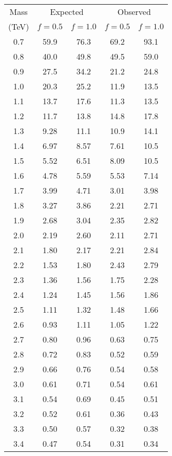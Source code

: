 \begin{table}[h!]
\begin{center}
\begin{tabular}{c||cc||cc}
\hline
Mass     & \multicolumn{2}{c}{Expected} & \multicolumn{2}{c}{Observed} \\
(\unit{TeV}) & $f=0.5$  & $f=1.0$ & $f=0.5$ & $f=1.0$  \\
\hline
\hline
0.7 & 59.9  &  76.3 & 69.2 &  93.1 \\
0.8 & 40.0  &  49.8 & 49.5 &  59.0 \\
0.9 & 27.5  &  34.2 & 21.2 &  24.8 \\
1.0 & 20.3  &  25.2 & 11.9 &  13.5\\
1.1 & 13.7  &  17.6 & 11.3 &  13.5 \\
1.2 & 11.7  &  13.8 & 14.8 &  17.8 \\
1.3 & 9.28  &  11.1 & 10.9 &  14.1 \\
1.4 & 6.97  &  8.57 & 7.61 &  10.5 \\
1.5 & 5.52  &  6.51 & 8.09 &  10.5 \\
1.6 & 4.78  &  5.59 & 5.53 &  7.14 \\
1.7 & 3.99  &  4.71 & 3.01 &  3.98 \\
1.8 & 3.27  &  3.86 & 2.21 &  2.71 \\
1.9 & 2.68  &  3.04 & 2.35 &  2.82 \\
2.0 & 2.19  &  2.60 & 2.11 &  2.71 \\
2.1 & 1.80  &  2.17 & 2.21 &  2.84 \\
2.2 & 1.53  &  1.80 & 2.43 &  2.79 \\
2.3 & 1.36  &  1.56 & 1.75 &  2.28 \\
2.4 & 1.24  &  1.45 & 1.56 &  1.86 \\
2.5 & 1.11  &  1.32 & 1.48 &  1.66 \\
2.6 & 0.93  &  1.11 & 1.05 &  1.22 \\
2.7 & 0.80  &  0.96 & 0.63 &  0.75 \\
2.8 & 0.72  &  0.83 & 0.52 &  0.59 \\
2.9 & 0.66  &  0.76 & 0.54 &  0.58 \\
3.0 & 0.61  &  0.71 & 0.54 &  0.61 \\
3.1 & 0.54  &  0.69 & 0.45 &  0.51 \\
3.2 & 0.52  &  0.61 & 0.36 &  0.43 \\
3.3 & 0.50  &  0.57 & 0.32 &  0.38 \\
3.4 & 0.47  &  0.54 & 0.31 &  0.34 \\

\end{tabular}
\end{center}
\end{table}
